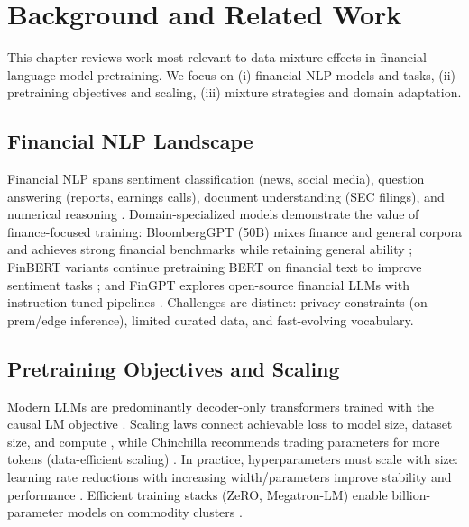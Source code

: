 \chapter{Background and Related Work}

This chapter reviews work most relevant to data mixture effects in financial language model pretraining. We focus on (i) financial NLP models and tasks, (ii) pretraining objectives and scaling, (iii) mixture strategies and domain adaptation.

\section{Financial NLP Landscape}
Financial NLP spans sentiment classification (news, social media), question answering (reports, earnings calls), document understanding (SEC filings), and numerical reasoning \parencite{yang2020finqa}. Domain-specialized models demonstrate the value of finance-focused training: BloombergGPT (50B) mixes finance and general corpora and achieves strong financial benchmarks while retaining general ability \parencite{wu2023bloomberggpt}; FinBERT variants continue pretraining BERT on financial text to improve sentiment tasks \parencite{araci2019finbert,yang2020finbert}; and FinGPT explores open-source financial LLMs with instruction-tuned pipelines \parencite{yang2023fingpt}. Challenges are distinct: privacy constraints (on-prem/edge inference), limited curated data, and fast-evolving vocabulary.

\section{Pretraining Objectives and Scaling}
Modern LLMs are predominantly decoder-only transformers trained with the causal LM objective \parencite{radford2019language,brown2020language,touvron2023llama}. Scaling laws connect achievable loss to model size, dataset size, and compute \parencite{kaplan2020scaling}, while Chinchilla recommends trading parameters for more tokens (data-efficient scaling) \parencite{hoffmann2022training}. In practice, hyperparameters must scale with size: learning rate reductions with increasing width/parameters improve stability and performance \parencite{mccandlish2018empirical}. Efficient training stacks (ZeRO, Megatron-LM) enable billion-parameter models on commodity clusters \parencite{rajbhandari2020zero,narayanan2021efficient}.

